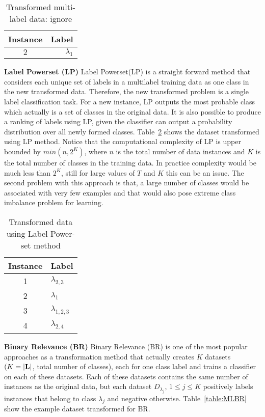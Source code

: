 \begin{table}[!htb]
\centering
\caption{Transformed multi-label data: ignore}
\label{table:MLf}
\begin{tabular}{c|r}
\toprule
Instance & Label \\
\hline
$2$ & $\lambda_1$ \\
\bottomrule
\end{tabular}
\end{table}
\fi

\textbf{Label Powerset (LP)} Label Powerset(LP) is a straight forward method that considers each unique set of labels in a multilabel training data as one class in the new transformed data. Therefore, the new transformed problem is a single label classification task. For a new instance, LP outputs the most probable class which actually is a set of classes in the original data. It is also possible to produce a ranking of labels using LP, given the classifier can output a probability distribution over all newly formed classes. Table~\ref{table:MLLP} shows the dataset transformed using LP method. Notice that the computational complexity of LP is upper bounded by $min(n,2^K)$, where $n$ is the total number of data instances and $K$ is the total number of classes in the training data. In practice complexity would be much less than $2^K$, still for large values of $T$ and $K$ this can be an issue. The second problem with this approach is that, a large number of classes would be associated with very few examples and that would also pose extreme class imbalance problem for learning.
\begin{table}[!htb]
\caption{Transformed data using Label Power-set method}
\label{table:MLLP}
\centering
\begin{tabular}{c|l}
\toprule
Instance & Label \\
\hline
1 & $\lambda_{2,3}$\\
2 & $\lambda_1$ \\
3 & $\lambda_{1,2,3}$ \\
4 & $\lambda _{2,4}$\\
\bottomrule
\end{tabular}
\end{table}
\textbf{Binary Relevance (BR)} Binary Relevance (BR) is one of the most popular approaches as a transformation method that actually creates $K$ datasets $(K = |\mathbf{L}|$, total number of classes), each for one class label and trains a classifier on each of these datasets. Each of these datasets contains the same number of instances as the original data, but each dataset $D_{\lambda_j}$, $1\leqslant j \leqslant K$ positively labels instances that belong to class $\lambda_j$ and negative otherwise. Table~\ref{table:MLBR} show the example dataset transformed for BR.

